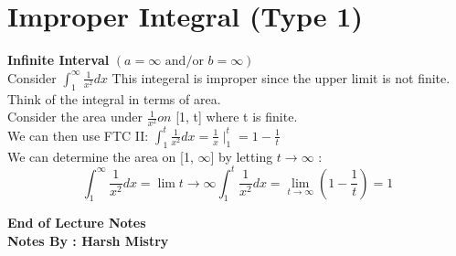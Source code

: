 \documentclass{article}
\begin{document}
\section{Improper Integral (Type 1)}
\textbf{Infinite Interval } \( ( a = \infty \text{ and/or } b = \infty) \) \\
Consider \( \int_{1}^{\infty} \frac{1}{x^2} dx \) This integeral is improper since the upper limit is not finite. Think of the integral in terms of area. \\

Consider the area under \( \frac{1}{x^2} on \) [1, t] where t is finite.\\
We can then use FTC II: 
\(\int_{1}^{t} \frac{1}{x^2} dx = \frac{1}{x} \mid_{1}^{t} = 1 - \frac{1}{t} \) \\
We can determine the area on [1, \(\infty \)] by letting \( t \rightarrow \infty\) : \\

$$ \int_{1}^{\infty} \frac{1}{x^2} dx = \lim{t \to \infty} \int_{1}^{t} \frac{1}{x^2} dx = \lim_{t \to \infty} (1 - \frac{1}{t}) = 1 $$




\begin{center}
\textbf{End of Lecture Notes} \\
\textbf{Notes By : Harsh Mistry}
\end{center}
\end{document}
